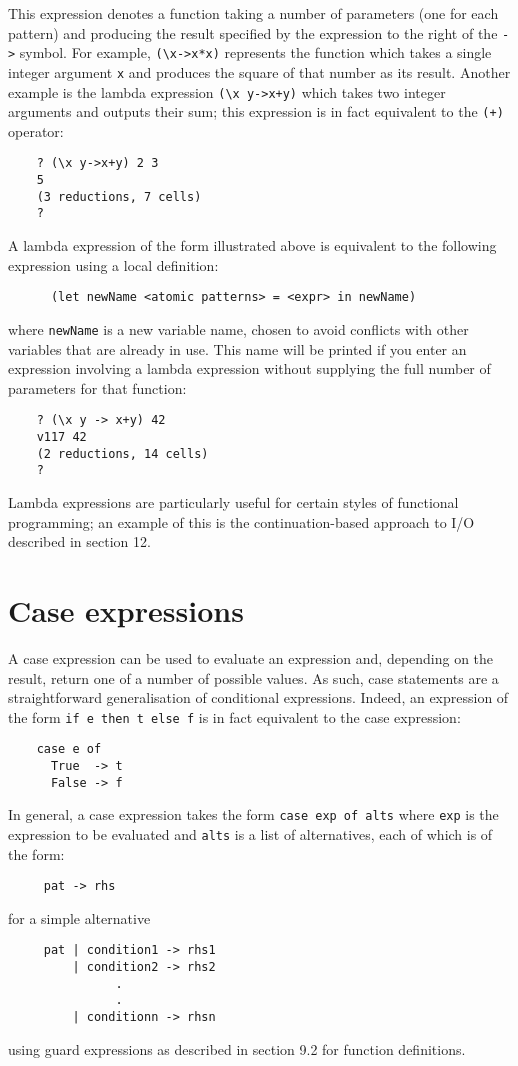 This expression denotes a function taking a number of  parameters  (one
for each pattern) and producing the result specified by the  expression
to the right of the \verb"->" symbol.  For example, \verb"(\x->x*x)"
represents  the
function which takes a single integer argument  \verb'x'  and  produces  the
square of that number as its result.  Another example is the lambda
expression \verb"(\x y->x+y)" which takes two integer  arguments  and  outputs
their sum; this expression is in fact equivalent to the \verb"(+)" operator:
\begin{verbatim}
    ? (\x y->x+y) 2 3
    5
    (3 reductions, 7 cells)
    ?
\end{verbatim}
A lambda expression of the form illustrated above is equivalent to  the
following expression using a local definition:
\begin{verbatim}
      (let newName <atomic patterns> = <expr> in newName)
\end{verbatim}
where \verb"newName" is a new variable name, chosen to avoid conflicts  with
other variables that are already in use.  This name will be printed  if
you enter an expression involving a lambda expression without supplying
the full number of parameters for that function:
\begin{verbatim}
    ? (\x y -> x+y) 42
    v117 42
    (2 reductions, 14 cells)
    ?
\end{verbatim}
Lambda expressions  are  particularly  useful  for  certain  styles  of
functional programming; an example of this  is  the  continuation-based
approach to I/O described in section 12.


\section{Case expressions}
A case expression can be used to evaluate an expression and,  depending
on the result, return one of a number of  possible  values.   As  such,
case statements are a  straightforward  generalisation  of  conditional
expressions.  Indeed, an expression of the form \verb"if e then t else f" is
in fact equivalent to the case expression:
\begin{verbatim}
    case e of 
      True  -> t
      False -> f
\end{verbatim}
In general, a case expression takes the form \verb"case exp of alts"  where
\verb"exp" is  the  expression  to  be  evaluated  and  \verb"alts" 
is  a  list  of
alternatives, each of which is of the form:
\begin{verbatim}
     pat -> rhs
\end{verbatim}
for a simple alternative
\begin{verbatim}
     pat | condition1 -> rhs1   
         | condition2 -> rhs2  
               .              
               .
         | conditionn -> rhsn
\end{verbatim}
using guard expressions as described in section 9.2
for function definitions.

